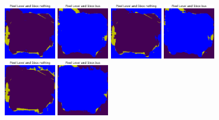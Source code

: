 \begin{figure}[h!]
  \centering
  \includegraphics[width=0.2\textwidth]{../../modelos-entrenados/unet-nonlocal/ejecucion4/predtrainmid0}
  \vrule
  \includegraphics[width=0.2\textwidth]{../../modelos-entrenados/unet-nonlocal/ejecucion4/predtrainmid5}
  \vrule
  \includegraphics[width=0.2\textwidth]{../../modelos-entrenados/unet-nonlocal/ejecucion5/predtrainmid0}
  \vrule
  \includegraphics[width=0.2\textwidth]{../../modelos-entrenados/unet-nonlocal/ejecucion5/predtrainmid5}
  \vrule
  \includegraphics[width=0.2\textwidth]{../../modelos-entrenados/unet-nonlocal/ejecucion7/predtrainmid0}
  \vrule
  \includegraphics[width=0.2\textwidth]{../../modelos-entrenados/unet-nonlocal/ejecucion7/predtrainmid6}

\end{figure}
